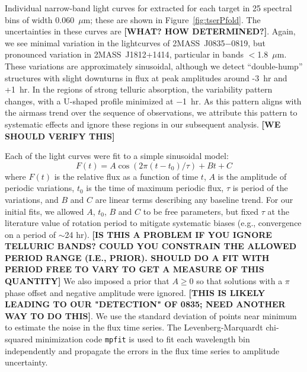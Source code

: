 \documentclass[twocolumn]{aastex6}
\newcommand{\sha}{2MASS~J0835$-$0819}
\newcommand{\shb}{2MASS~J1812+1414}
\begin{document}
Individual narrow-band light curves for extracted for each target in 25 spectral bins of width 0.060~$\mu$m; these are shown in Figure~\ref{fig:tserPfold}. The uncertainties in these curves are {\bf [WHAT? HOW DETERMINED?]}. Again, we see minimal variation in the lightcurves of {\sha}, but pronounced variation in {\shb}, particular in bands $<$1.8~$\mu$m.  These variations are approximately sinusoidal, although we detect ``double-hump'' structures with slight downturns in flux at peak amplitudes around -3~hr and +1~hr. In the regions of strong telluric absorption, the variability pattern changes, with a U-shaped profile minimized at $-$1~hr. As this pattern aligns with the airmass trend over the sequence of observations, we attribute this pattern to systematic effects and ignore these regions in our subsequent analysis.
{\bf [WE SHOULD VERIFY THIS]}

Each of the light curves were fit to a simple sinusoidal model:
\begin{equation}\label{eq:cosfit}
F(t) = A \cos(2 \pi (t - t_0)/\tau) + B t + C
\end{equation}
where $F(t)$ is the relative flux as a function of time $t$, $A$ is the amplitude of periodic variations, $t_0$ is the time of maximum periodic flux, $\tau$ is period of the variations, and $B$ and $C$ are linear terms describing any baseline trend.
For our initial fits, we allowed $A$, $t_0$, $B$ and $C$ to be free parameters, but fixed $\tau$ at the literature value of rotation period to mitigate systematic biases (e.g., convergence on a period of $\sim$24 hr). {\bf [IS THIS A PROBLEM IF YOU IGNORE TELLURIC BANDS? COULD YOU CONSTRAIN THE ALLOWED PERIOD RANGE (I.E., PRIOR). SHOULD DO A FIT WITH PERIOD FREE TO VARY TO GET A MEASURE OF THIS QUANTITY]}
We also imposed a prior that $A \geq 0$ so that solutions with a $\pi$ phase offset and negative amplitude were ignored.
{\bf [THIS IS LIKELY LEADING TO OUR "DETECTION" OF 0835; NEED ANOTHER WAY TO DO THIS]}.
We use the standard deviation of points near minimum to estimate the noise in the flux time series.
The Levenberg-Marquardt chi-squared minimization code \texttt{mpfit} is used to fit each wavelength bin independently and propagate the errors in the flux time series to amplitude uncertainty.
\end{document}

